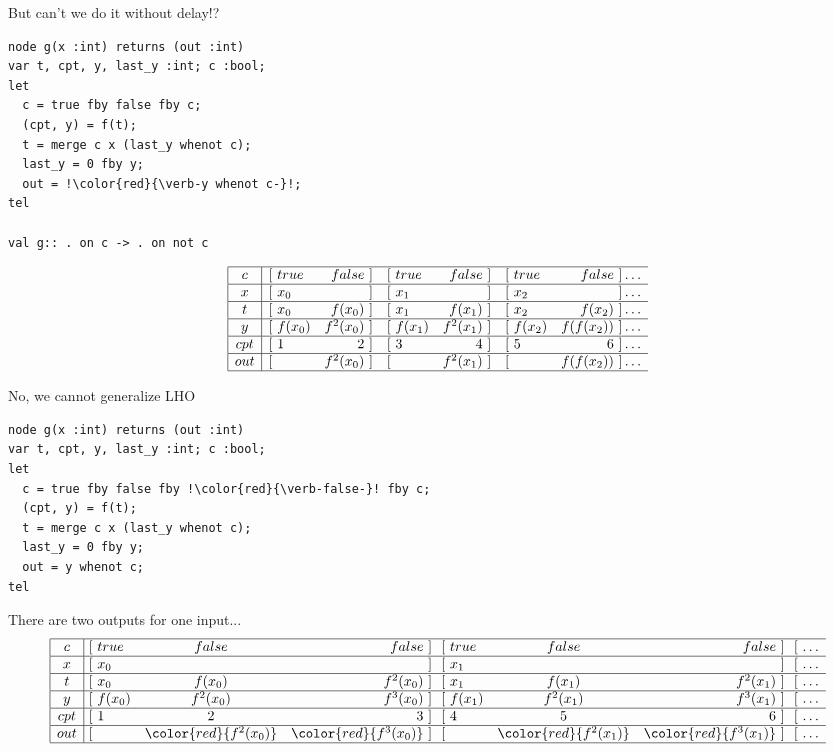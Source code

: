 \documentclass[xcolor=dvipsnames]{beamer}
\def\li{\\ \hline}
\begin{document}
\begin{frame}[fragile]{But can't we do it without delay!?}
\begin{lstlisting}[escapechar=!]
node g(x :int) returns (out :int)
var t, cpt, y, last_y :int; c :bool;
let
  c = true fby false fby c;
  (cpt, y) = f(t);
  t = merge c x (last_y whenot c);
  last_y = 0 fby y;
  out = !\color{red}{\verb-y whenot c-}!;
tel

val g:: . on c -> . on not c
\end{lstlisting}
\[
\begin{array}{|c|lrlrlrlr} \hline
c &[\ true & false\       ]&[\ true & false\       ]&[\ true & false\       ]\ldots\li
x &[\ x_0 &               ]&[\ x_1 &               ]&[\ x_2 &               ]\ldots\li
t &[\ x_0 & f(x_0)\       ]&[\ x_1 & f(x_1)\       ]&[\ x_2 & f(x_2)\       ]\ldots\li
y &[\ f(x_0) & f^2(x_0)\ ]&[\ f(x_1) & f^2(x_1)\ ]&[\ f(x_2) & f(f(x_2))\ ]\ldots\li
cpt &[\ 1 & 2 \ ]&[\ 3 & 4\ ]&[\ 5 & 6\ ]\ldots\li
out &[&f^2(x_0)\         ]&[&f^2(x_1)\           ]&[&f(f(x_2))\         ]\ldots\li
\end{array}
\]
\end{frame}

\begin{frame}[fragile]{No, we cannot generalize LHO}
\begin{lstlisting}[escapechar=!]
node g(x :int) returns (out :int)
var t, cpt, y, last_y :int; c :bool;
let
  c = true fby false fby !\color{red}{\verb-false-}! fby c;
  (cpt, y) = f(t);
  t = merge c x (last_y whenot c);
  last_y = 0 fby y;
  out = y whenot c;
tel
\end{lstlisting}
There are two outputs for one input...
\[
\begin{array}{|c|@{\ [\ }lcr@{\ ]\ }@{\ [\ }lcr@{\ ]\ }@{\ [\ }lr@{\ ]\ }c} \hline
c & true   & false   & false    & true   & false   & false   &     \ldots\li
x & x_0    &         &          & x_1    &         &         &   \ldots\li
t & x_0    & f(x_0)  & f^2(x_0) & x_1    & f(x_1)  & f^2(x_1)&       \ldots\li
y & f(x_0) & f^2(x_0) & f^3(x_0)& f(x_1) & f^2(x_1)& f^3(x_1)&   \ldots\li
cpt & 1 & 2 & 3 & 4 & 5 & 6 &\ldots\li
out &      & \color{red}{f^2(x_0)} & \color{red}{f^3(x_0)}&        & \color{red}{f^2(x_1)}& \color{red}{f^3(x_1)}& \ldots\li
\end{array}
\]
\end{frame}
\end{document}
